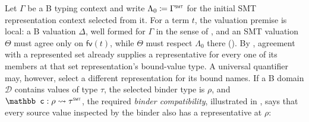 Let \(\Gamma\) be a B typing context and write
\(\Lambda_0\coloneq\toSMT{\Gamma}\) for the initial SMT representation context selected from it.
For a term \(t\), the valuation premise is local: a B valuation \(\Delta\), well formed for \(\Gamma\) in the sense of , and an SMT valuation \(\Theta\) must agree only on \(\mathsf{fv}(t)\), while \(\Theta\) must respect \(\Lambda_0\) there ().
By , agreement with a represented set already supplies a representative for every one of its members at that set representation's bound-value type.
A universal quantifier may, however, select a different representation for its bound names.
If a B domain \(\mathcal D\) contains values of type \(\tau\), the selected binder type is \(\rho\), and \(\mathbb c:\castpath{\rho}{\toSMT{\tau}}\), the required \emph{binder compatibility}, illustrated in , says that every source value inspected by the binder also has a representative at \(\rho\):

